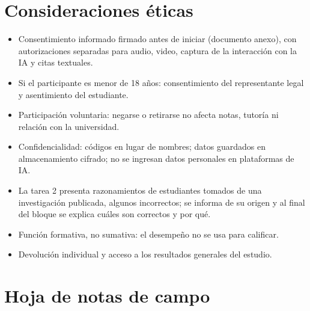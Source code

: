 \documentclass[11pt,letterpaper]{article}
\begin{document}
\section{Consideraciones éticas}
\begin{itemize}
  \item Consentimiento informado firmado antes de iniciar (documento anexo), con autorizaciones separadas para audio, video, captura de la interacción con la IA y citas textuales.
  \item Si el participante es menor de 18 años: consentimiento del representante legal y asentimiento del estudiante.
  \item Participación voluntaria: negarse o retirarse no afecta notas, tutoría ni relación con la universidad.
  \item Confidencialidad: códigos en lugar de nombres; datos guardados en almacenamiento cifrado; no se ingresan datos personales en plataformas de IA.
  \item La tarea 2 presenta razonamientos de estudiantes tomados de una investigación publicada, algunos incorrectos; se informa de su origen y al final del bloque se explica cuáles son correctos y por qué.
  \item Función formativa, no sumativa: el desempeño no se usa para calificar.
  \item Devolución individual y acceso a los resultados generales del estudio.
\end{itemize}

\appendix
\section{Hoja de notas de campo}\label{sec:notas}
\end{document}

